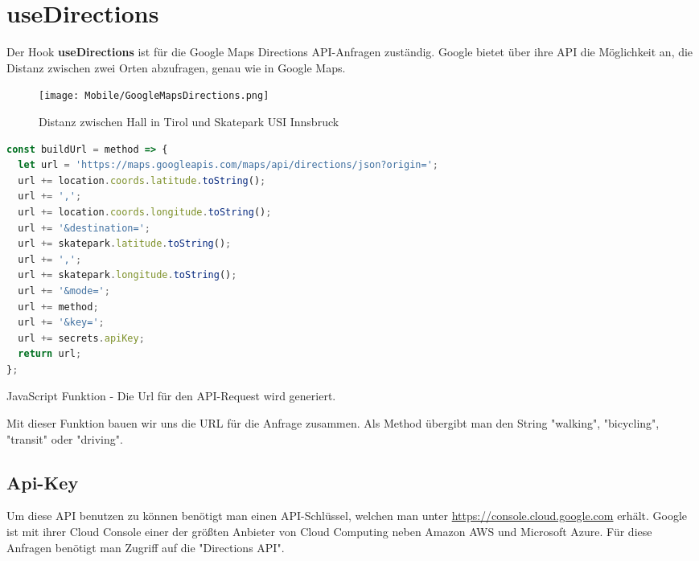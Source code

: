 \section{useDirections}
Der Hook \textbf{useDirections} ist für die Google Maps Directions API-Anfragen zuständig. Google bietet über
ihre API die Möglichkeit an, die Distanz zwischen zwei Orten abzufragen, genau wie in Google Maps.

\begin{figure}[H]
  \begin{center}
    \texttt{[image: Mobile/GoogleMapsDirections.png]}
    \caption{Distanz zwischen Hall in Tirol und Skatepark USI Innsbruck}
  \end{center}
\end{figure}

\begin{code}[htp]
\begin{lstlisting}[firstnumber=1,language=JavaScript, style=JSX]
const buildUrl = method => {
  let url = 'https://maps.googleapis.com/maps/api/directions/json?origin=';
  url += location.coords.latitude.toString();
  url += ',';
  url += location.coords.longitude.toString();
  url += '&destination=';
  url += skatepark.latitude.toString();
  url += ',';
  url += skatepark.longitude.toString();
  url += '&mode=';
  url += method;
  url += '&key=';
  url += secrets.apiKey;
  return url;
};
\end{lstlisting}
\caption{JavaScript Funktion - Die Url für den API-Request wird generiert.}
\end{code}

Mit dieser Funktion bauen wir uns die URL für die Anfrage zusammen. Als Method übergibt man den
String "walking", "bicycling", "transit"{ }oder "driving".

\subsection{Api-Key}
\label{apikey}
Um diese API benutzen zu können benötigt man einen API-Schlüssel, welchen man unter
\url{https://console.cloud.google.com} erhält. Google ist mit ihrer Cloud Console einer der größten
Anbieter von Cloud Computing neben Amazon AWS und Microsoft Azure. Für diese Anfragen benötigt man
Zugriff auf die "Directions API".
